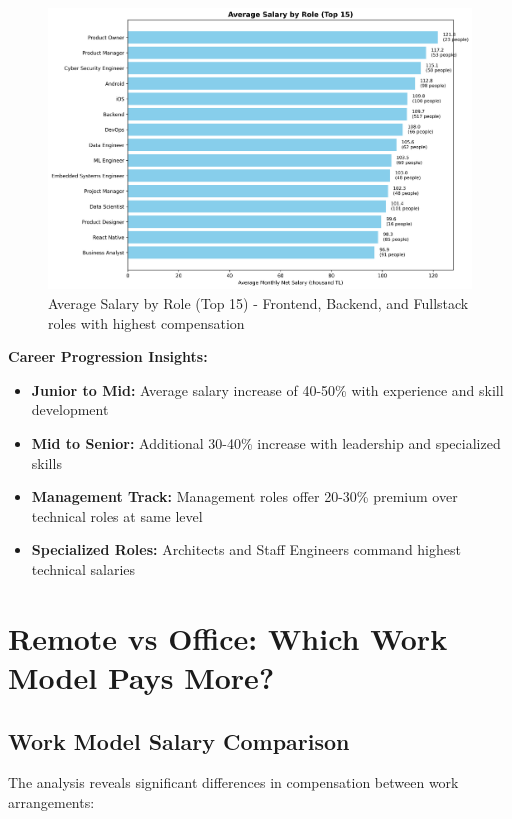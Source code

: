 \documentclass[12pt,a4paper]{article}
\begin{document}
\begin{figure}[H]
    \centering
    \includegraphics[width=\textwidth]{figures/barplot_role_salaries.png}
    \caption{Average Salary by Role (Top 15) - Frontend, Backend, and Fullstack roles with highest compensation}
\end{figure}

\textbf{Career Progression Insights:}
\begin{itemize}
    \item \textbf{Junior to Mid:} Average salary increase of 40-50\% with experience and skill development
    \item \textbf{Mid to Senior:} Additional 30-40\% increase with leadership and specialized skills
    \item \textbf{Management Track:} Management roles offer 20-30\% premium over technical roles at same level
    \item \textbf{Specialized Roles:} Architects and Staff Engineers command highest technical salaries
\end{itemize}

\section{Remote vs Office: Which Work Model Pays More?}

\subsection{Work Model Salary Comparison}
The analysis reveals significant differences in compensation between work arrangements:
\end{document}
